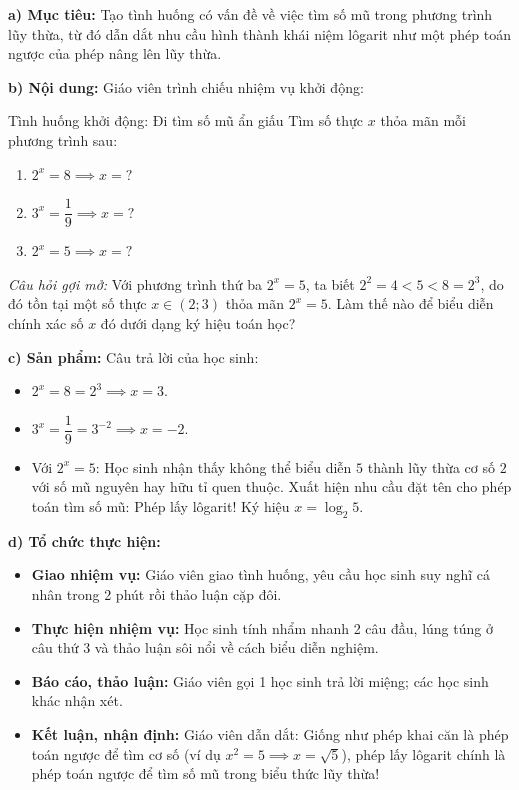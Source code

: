\documentclass[12pt, a4paper]{article}
\begin{document}
\noindent \textbf{a) Mục tiêu:}
Tạo tình huống có vấn đề về việc tìm số mũ trong phương trình lũy thừa, từ đó dẫn dắt nhu cầu hình thành khái niệm lôgarit như một phép toán ngược của phép nâng lên lũy thừa.

\noindent \textbf{b) Nội dung:}
Giáo viên trình chiếu nhiệm vụ khởi động:
\begin{pedabox}{Tình huống khởi động: Đi tìm số mũ ẩn giấu}
Tìm số thực $x$ thỏa mãn mỗi phương trình sau:
\begin{enumerate}[leftmargin=0.6cm]
    \item $2^x = 8 \implies x = ?$
    \item $3^x = \dfrac{1}{9} \implies x = ?$
    \item $2^x = 5 \implies x = ?$
\end{enumerate}
\textit{Câu hỏi gợi mở:} Với phương trình thứ ba $2^x = 5$, ta biết $2^2 = 4 < 5 < 8 = 2^3$, do đó tồn tại một số thực $x \in (2; 3)$ thỏa mãn $2^x = 5$. Làm thế nào để biểu diễn chính xác số $x$ đó dưới dạng ký hiệu toán học?
\end{pedabox}

\noindent \textbf{c) Sản phẩm:}
Câu trả lời của học sinh:
\begin{itemize}
    \item $2^x = 8 = 2^3 \implies x = 3$.
    \item $3^x = \dfrac{1}{9} = 3^{-2} \implies x = -2$.
    \item Với $2^x = 5$: Học sinh nhận thấy không thể biểu diễn $5$ thành lũy thừa cơ số $2$ với số mũ nguyên hay hữu tỉ quen thuộc. Xuất hiện nhu cầu đặt tên cho phép toán tìm số mũ: Phép lấy lôgarit! Ký hiệu $x = \log_2 5$.
\end{itemize}

\noindent \textbf{d) Tổ chức thực hiện:}
\begin{itemize}[leftmargin=0.6cm]
    \item \textbf{Giao nhiệm vụ:} Giáo viên giao tình huống, yêu cầu học sinh suy nghĩ cá nhân trong 2 phút rồi thảo luận cặp đôi.
    \item \textbf{Thực hiện nhiệm vụ:} Học sinh tính nhẩm nhanh 2 câu đầu, lúng túng ở câu thứ 3 và thảo luận sôi nổi về cách biểu diễn nghiệm.
    \item \textbf{Báo cáo, thảo luận:} Giáo viên gọi 1 học sinh trả lời miệng; các học sinh khác nhận xét.
    \item \textbf{Kết luận, nhận định:} Giáo viên dẫn dắt: Giống như phép khai căn là phép toán ngược để tìm cơ số (ví dụ $x^2 = 5 \implies x = \sqrt{5}$), phép lấy lôgarit chính là phép toán ngược để tìm số mũ trong biểu thức lũy thừa!
\end{itemize}
\end{document}
